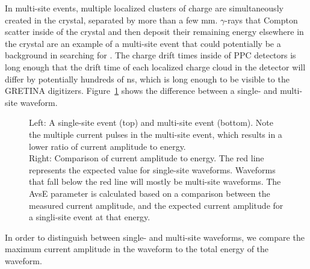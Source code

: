 \documentclass[/main.tex]{subfiles}
\begin{document}
In multi-site events, multiple localized clusters of charge are simultaneously created in the crystal, separated by more than a few mm.
$\gamma$-rays that Compton scatter inside of the crystal and then deposit their remaining energy elsewhere in the crystal are an example of a multi-site event that could potentially be a background in searching for \znbb.
The charge drift times inside of PPC detectors is long enough that the drift time of each localized charge cloud in the detector will differ by potentially hundreds of ns, which is long enough to be visible to the GRETINA digitizers.
Figure~\ref{fig:avse} shows the difference between a single- and multi-site waveform.
\\
\begin{figure}
  \centering
  \caption[Multi-site event cut]{\label{fig:avse}
    Left: A single-site event (top) and multi-site event (bottom). Note the multiple current pulses in the multi-site event, which results in a lower ratio of current amplitude to energy.\\
    Right: Comparison of current amplitude to energy. The red line represents the expected value for single-site waveforms. Waveforms that fall below the red line will mostly be multi-site waveforms. The AvsE parameter is calculated based on a comparison between the measured current amplitude, and the expected current amplitude for a singli-site event at that energy.
  }
\end{figure}
In order to distinguish between single- and multi-site waveforms, we compare the maximum current amplitude in the waveform to the total energy of the waveform\cite{mjdavse}.
\end{document}
